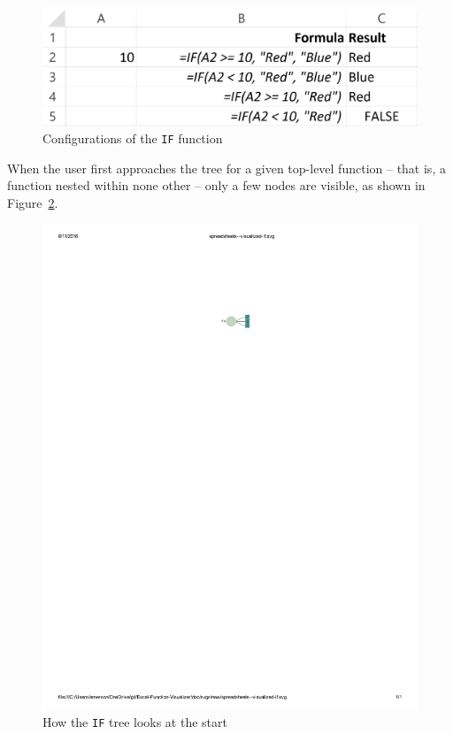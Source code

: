 \documentclass[conference]{IEEEtran}
\begin{document}
	\begin{figure}[h] \centering \includegraphics[width=\columnwidth]{ifExample}
		\caption{Configurations of the \texttt{IF} function} \label{fig:ifexample} \end{figure}
	
	When the user first approaches the tree for a given top-level function -- that
	is, a function nested within none other -- only a few nodes are visible, as
	shown in Figure~\ref{fig:startpic}. 
	
	\begin{figure}[h] \centering \includegraphics[width=.4\columnwidth]{start} \caption{How the
			\texttt{IF} tree looks at the start} \label{fig:startpic} \end{figure}
	
\end{document}
